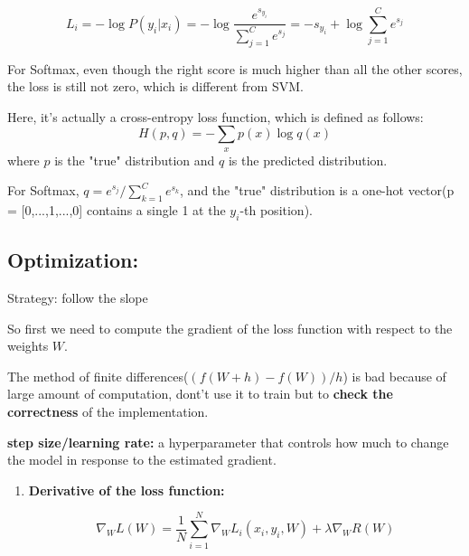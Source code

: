 \documentclass{article}
\numberwithin{equation}{section}
\begin{document}
\begin{CJK}{UTF8}{gbsn}
\begin{enumerate}
    \begin{equation}
        L_i = -\log P(y_i | x_i) = -\log \frac{e^{s_{y_i}}}{\sum_{j=1}^{C} e^{s_j}} = -s_{y_i} + \log \sum_{j=1}^{C} e^{s_j}
    \end{equation}

    For Softmax, even though the right score is much higher than all the other scores, the loss is still not zero, which is different from SVM.\par
    
    Here, it's actually a cross-entropy loss function, which is defined as follows:
    \begin{equation*}\tag {Cross-entropy}
        H(p, q) = -\sum_{x} p(x) \log q(x)
    \end{equation*}
    where \(p\) is the "true" distribution and \(q\) is the predicted distribution.\par
    For Softmax, \(q = e^{s_j} / \sum_{k=1}^{C} e^{s_k}\), and the "true" distribution is a one-hot vector(p = [0,...,1,...,0] contains a single 1 at the \(y_i\)-th position).\par
\end{enumerate}

\subsection{Optimization:}
    Strategy: follow the slope

    So first we need to compute the gradient of the loss function with respect to the weights \(W\).\par
    The method of finite differences(\((f(W+h) - f(W)) / h\)) is bad because of large amount of computation, dont't use it to train but to \textbf{check the correctness} of the implementation.\par

    \vspace{0.5cm}
    \textbf{step size/learning rate:} a hyperparameter that controls how much to change the model in response to the estimated gradient.\par

    \begin{enumerate}
        \item \textbf{Derivative of the loss function:}\par
        \begin{equation}
        \nabla_W L(W) = \frac{1}{N} \sum_{i=1}^{N} \nabla_W L_i(x_i, y_i, W) + \lambda \nabla_W R(W)
        \end{equation}


\end{enumerate}
\end{CJK}
\end{document}
